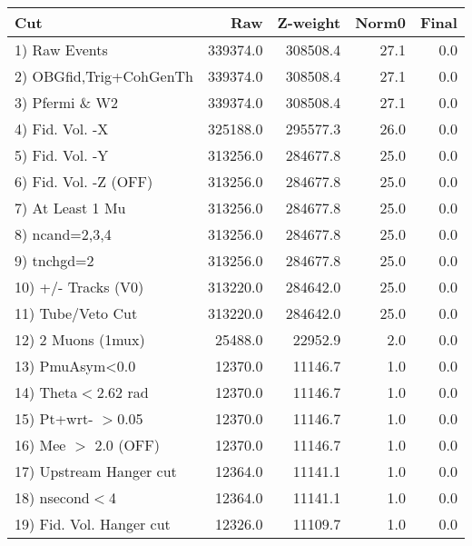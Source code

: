  \begin{table}[h!]\centering
 \begin{tabular}{||l||r|r|r|r||}
 \hline
 \hline
 Cut & Raw & Z-weight & Norm0 & Final \\
 \hline
  1) Raw Events           &    339374.0 &    308508.4 &        27.1 &         0.0 \\
  2) OBGfid,Trig+CohGenTh &    339374.0 &    308508.4 &        27.1 &         0.0 \\
  3) Pfermi \& W2         &    339374.0 &    308508.4 &        27.1 &         0.0 \\
  4) Fid. Vol. -X         &    325188.0 &    295577.3 &        26.0 &         0.0 \\
  5) Fid. Vol. -Y         &    313256.0 &    284677.8 &        25.0 &         0.0 \\
  6) Fid. Vol. -Z (OFF)   &    313256.0 &    284677.8 &        25.0 &         0.0 \\
  7) At Least 1 Mu        &    313256.0 &    284677.8 &        25.0 &         0.0 \\
  8) ncand=2,3,4          &    313256.0 &    284677.8 &        25.0 &         0.0 \\
  9) tnchgd=2             &    313256.0 &    284677.8 &        25.0 &         0.0 \\
 10) +/- Tracks (V0)      &    313220.0 &    284642.0 &        25.0 &         0.0 \\
 11) Tube/Veto Cut        &    313220.0 &    284642.0 &        25.0 &         0.0 \\
 12) 2 Muons (1mux)       &     25488.0 &     22952.9 &         2.0 &         0.0 \\
 13) PmuAsym<0.0          &     12370.0 &     11146.7 &         1.0 &         0.0 \\
 14) Theta$<$2.62 rad     &     12370.0 &     11146.7 &         1.0 &         0.0 \\
 15) Pt+wrt- $>$0.05      &     12370.0 &     11146.7 &         1.0 &         0.0 \\
 16) Mee $>$ 2.0  (OFF)   &     12370.0 &     11146.7 &         1.0 &         0.0 \\
 17) Upstream Hanger cut  &     12364.0 &     11141.1 &         1.0 &         0.0 \\
 18) nsecond$<$4          &     12364.0 &     11141.1 &         1.0 &         0.0 \\
 19) Fid. Vol. Hanger cut &     12326.0 &     11109.7 &         1.0 &         0.0 \\

\end{tabular}
\end{table}
